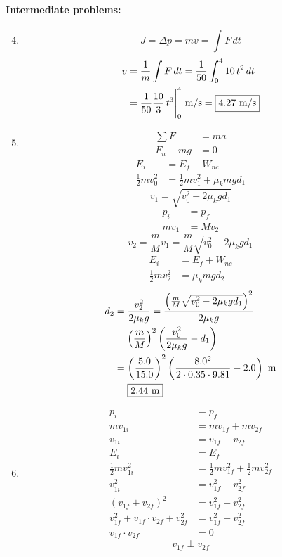 \documentclass[12pt,letterpaper]{article}
\begin{document}
\begin{multicols}{2}
\paragraph{Intermediate problems:}
\begin{enumerate}
\setcounter{enumi}{3}
\item
$$J = \Delta p = mv = \int F\,dt$$
\[
\begin{aligned}v &= \frac{1}{m} \int F\,dt = \frac{1}{50} \int_0^4 10\, t^2\, dt\\
    &= \frac{1}{50} \frac{10}{3}\, t^3\Biggr|_0^4\ \text{m\slash s} = \fbox{4.27 m\slash s}
\end{aligned}
\]

\item \[
\begin{aligned}
\sum F &= ma\\
F_n - mg &= 0
\end{aligned}
\] \[
\begin{aligned}
E_i &= E_f+W_{nc}\\
\frac{1}{2}mv_0^2 &= \frac{1}{2}mv_1^2+\mu_k mgd_1
\end{aligned}
\]
$$v_1 = \sqrt{v_0^2-2\mu_k gd_1}$$
\[
\begin{aligned}
p_i &= p_f\\
mv_1 &= Mv_2
\end{aligned}
\]
$$v_2 = \frac{m}{M}v_1 = \frac{m}{M}\sqrt{v_0^2-2\mu_k gd_1}$$
\[
\begin{aligned}
E_i &= E_f+W_{nc}\\
\frac{1}{2}mv_2^2 &= \mu_k mgd_2
\end{aligned}
\] \[
\begin{aligned}
d_2 &= \frac{v_2^2}{2\mu_k g} = \frac{\left(\frac{m}{M}\sqrt{v_0^2-2\mu_k gd_1}\right)^2}{2\mu_k g}\\
&= \left(\frac{m}{M}\right)^2\left(\frac{v_0^2}{2\mu_k g} - d_1\right)\\
&= \left(\frac{5.0}{15.0}\right)^2\left(\frac{8.0^2}{2\cdot 0.35\cdot 9.81} - 2.0\right)\ \text{m}\\
&= \fbox{2.44 m}
\end{aligned}
\]

\item \[
\begin{aligned}
p_i &= p_f\\
mv_{1i} &= mv_{1f} + mv_{2f}\\
v_{1i} &= v_{1f} + v_{2f}\\
E_i &= E_f\\
\frac{1}{2}mv_{1i}^2 &= \frac{1}{2}mv_{1f}^2 + \frac{1}{2}mv_{2f}^2\\
v_{1i}^2 &= v_{1f}^2 + v_{2f}^2\\
\left(v_{1f} + v_{2f}\right)^2 &= v_{1f}^2 + v_{2f}^2\\
v_{1f}^2 + v_{1f} \cdot v_{2f} + v_{2f}^2 &= v_{1f}^2 + v_{2f}^2\\
v_{1f} \cdot v_{2f} &= 0
\end{aligned}
\]
$$v_{1f} \perp v_{2f}$$
\end{enumerate}

\end{multicols}
\end{document}
